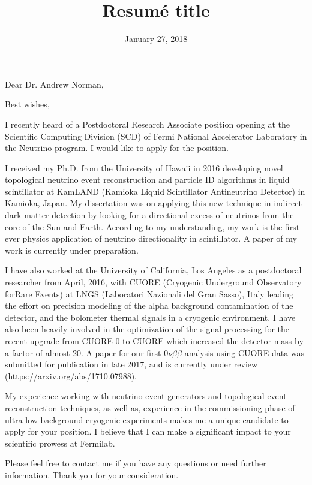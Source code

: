 \documentclass[11pt,a4paper,sans]{moderncv}        %
\title{Resumé title}                               %
\begin{document}
\date{January 27, 2018}
\opening{Dear Dr. Andrew Norman,}
\closing{Best wishes,}
\makelettertitle

I recently heard of a Postdoctoral Research Associate position opening at the
Scientific Computing Division (SCD) of Fermi National Accelerator Laboratory in
the Neutrino program. I would like to apply for the position.

I received my Ph.D. from the University of Hawaii in 2016 developing novel
topological neutrino event reconstruction and particle ID algorithms in liquid
scintillator at KamLAND (Kamioka Liquid Scintillator Antineutrino Detector) in
Kamioka, Japan. My dissertation was on applying this new technique in indirect
dark matter detection by looking for a directional excess of neutrinos from the
core of the Sun and Earth. According to my understanding, my work is the first
ever physics application of neutrino directionality in scintillator. A paper of
my work is currently under preparation.

I have also worked at the University of California, Los Angeles as a
postdoctoral researcher from April, 2016, with CUORE (Cryogenic Underground
Observatory forRare Events)  at LNGS (Laboratori Nazionali del Gran Sasso),
Italy leading the effort on precision modeling of the alpha background
contamination of the detector, and the bolometer thermal signals in a cryogenic
environment. I have also been heavily involved in the optimization of the
signal processing for the recent upgrade from CUORE-0 to CUORE which increased
the detector mass by a factor of almost 20. A paper for our first
$0\nu\beta\beta$ analysis using CUORE data was submitted for publication in
late 2017, and is currently under review (https://arxiv.org/abs/1710.07988).

My experience working with neutrino event generators and topological event
reconstruction techniques, as well as, experience in the commissioning phase of
ultra-low background cryogenic experiments makes me a unique candidate to apply
for your position. I believe that I can make a significant impact to your
scientific prowess at Fermilab.

Please feel free to contact me if you have any questions or need further
information. Thank you for your consideration.

\makeletterclosing
\end{document}
